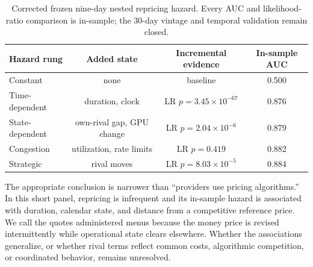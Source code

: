 \documentclass[11pt]{article}
\newcommand{\1}{\mathbf{1}}
\begin{document}
\begin{table}[H]
\centering
\small
\begin{tabular}{lccc}
\toprule
Hazard rung & Added state & Incremental evidence & In-sample AUC \\
\midrule
Constant & none & baseline & 0.500 \\
Time-dependent & duration, clock & LR $p=3.45\times10^{-67}$ & 0.876 \\
State-dependent & own-rival gap, GPU change & LR $p=2.04\times10^{-6}$ & 0.879 \\
Congestion & utilization, rate limits & LR $p=0.419$ & 0.882 \\
Strategic & rival moves & LR $p=8.03\times10^{-5}$ & 0.884 \\
\bottomrule
\end{tabular}
\caption{Corrected frozen nine-day nested repricing hazard.  Every AUC and
likelihood-ratio comparison is in-sample; the 30-day vintage and temporal
validation remain closed.}
\label{tab:hazard}
\end{table}

The appropriate conclusion is narrower than ``providers use pricing
algorithms.''  In this short panel, repricing is infrequent and its in-sample
hazard is associated with duration, calendar state, and distance from a
competitive reference price.  We call the quotes administered menus because the
money price is revised intermittently while operational state clears elsewhere.
Whether the associations generalize, or whether rival terms reflect common
costs, algorithmic competition, or coordinated behavior, remains unresolved.
\end{document}
